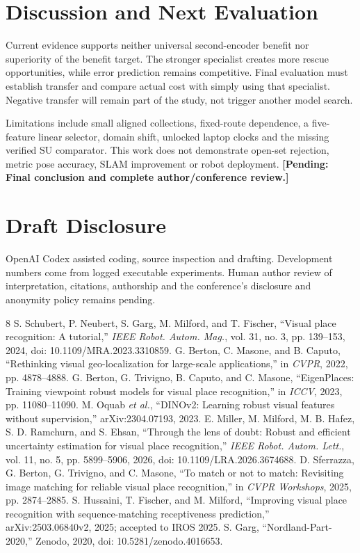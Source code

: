 \documentclass[conference]{IEEEtran}
\newcommand{\pending}[1]{\textbf{[Pending: #1]}}
\begin{document}
\section{Discussion and Next Evaluation}
Current evidence supports neither universal second-encoder benefit nor
superiority of the benefit target. The stronger specialist creates more
rescue opportunities, while error prediction remains competitive. Final
evaluation must establish transfer and compare actual cost with simply
using that specialist. Negative transfer will remain part of the study,
not trigger another model search.

Limitations include small aligned collections, fixed-route dependence,
a five-feature linear selector, domain shift, unlocked laptop clocks and
the missing verified SU comparator. This work does not demonstrate open-set
rejection, metric pose accuracy, SLAM improvement or robot deployment.
\pending{Final conclusion and complete author/conference review.}

\section*{Draft Disclosure}
OpenAI Codex assisted coding, source inspection and drafting. Development
numbers come from logged executable experiments. Human author review of
interpretation, citations, authorship and the conference's disclosure and
anonymity policy remains pending.

\begin{thebibliography}{8}
 S. Schubert, P. Neubert, S. Garg, M. Milford, and
T. Fischer, ``Visual place recognition: A tutorial,'' \emph{IEEE Robot.
Autom. Mag.}, vol. 31, no. 3, pp. 139--153, 2024,
doi: 10.1109/MRA.2023.3310859.
 G. Berton, C. Masone, and B. Caputo, ``Rethinking visual
geo-localization for large-scale applications,'' in \emph{CVPR}, 2022,
pp. 4878--4888.
 G. Berton, G. Trivigno, B. Caputo, and C. Masone,
``EigenPlaces: Training viewpoint robust models for visual place
recognition,'' in \emph{ICCV}, 2023, pp. 11080--11090.
 M. Oquab \emph{et al.}, ``DINOv2: Learning robust visual
features without supervision,'' arXiv:2304.07193, 2023.
 E. Miller, M. Milford, M. B. Hafez, S. D. Ramchurn, and
S. Ehsan, ``Through the lens of doubt: Robust and efficient uncertainty
estimation for visual place recognition,'' \emph{IEEE Robot. Autom. Lett.},
vol. 11, no. 5, pp. 5899--5906, 2026, doi: 10.1109/LRA.2026.3674688.
 D. Sferrazza, G. Berton, G. Trivigno, and C. Masone,
``To match or not to match: Revisiting image matching for reliable visual
place recognition,'' in \emph{CVPR Workshops}, 2025, pp. 2874--2885.
 S. Hussaini, T. Fischer, and M. Milford, ``Improving visual
place recognition with sequence-matching receptiveness prediction,''
arXiv:2503.06840v2, 2025; accepted to IROS 2025.
 S. Garg, ``Nordland-Part-2020,'' Zenodo, 2020,
doi: 10.5281/zenodo.4016653.
\end{thebibliography}
\end{document}
